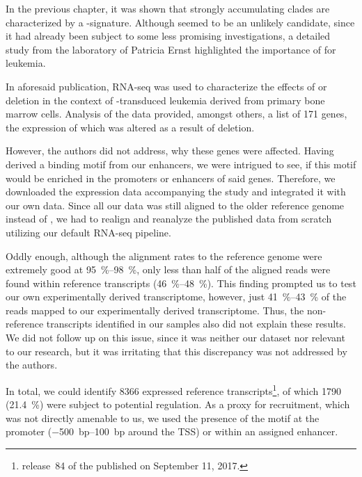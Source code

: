 In the previous chapter, it was shown that strongly accumulating clades are characterized by a -signature. Although  seemed to be an unlikely candidate, since it had already been subject to some less promising investigations\cite{Bach2009}, a detailed study from the laboratory of Patricia Ernst highlighted the importance of  for \mllafnine leukemia\cite{Chen2017a}.

In aforesaid publication, RNA-seq was used to characterize the effects of  or  deletion in the context of \mllafnine-transduced leukemia derived from \kithi primary bone marrow cells. Analysis of the data provided, amongst others, a list of \num{171} genes, the expression of which was altered as a result of  deletion. 

However, the authors did not address, why these genes were affected. Having derived a  binding motif from our enhancers, we were intrigued to see, if this motif would be enriched in the promoters or enhancers of said genes.  Therefore, we downloaded the expression data accompanying the study and integrated it with our own data. Since all our data was still aligned to the older reference genome \mmnine instead of \mmten, we had to realign and reanalyze the published data from scratch utilizing our default RNA-seq pipeline. 

Oddly enough, although the alignment rates to the reference genome \mmnine were extremely good at \SIrange{95}{98}{\percent}, only less than half of the aligned reads were found within reference transcripts (\SIrange{46}{48}{\percent}). This finding prompted us to test our own experimentally derived transcriptome, however, just \SIrange{41}{43}{\percent} of the reads mapped to our experimentally derived transcriptome. Thus, the non-reference transcripts identified in our samples also did not explain these results. We did not follow up on this issue, since it was neither our dataset nor relevant to our research, but it was irritating that this discrepancy was not addressed by the authors\cite{Chen2017a}. 

In total, we could identify \num{8366} expressed reference transcripts\footnote{release~\num{84} of the  published on September 11, 2017.}, of which \num{1790} (\SI{21.4}{\percent}) were subject to potential  regulation. As a proxy for  recruitment, which was not directly amenable to us, we used the presence of the motif \motifmlltwo at the promoter (\SIrange{-500}{+100}{bp} around the TSS) or within an assigned enhancer. 
	
